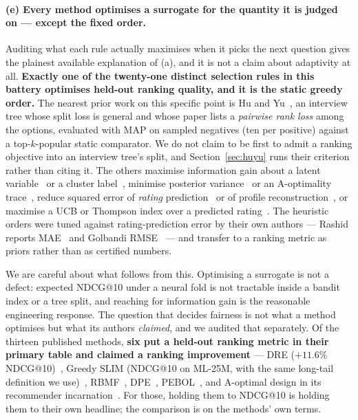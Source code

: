\documentclass[11pt]{article}
\begin{document}
\paragraph{(e) Every method optimises a surrogate for the quantity it is judged on --- except the
fixed order.} Auditing what each rule actually maximises when it picks the next question gives the
plainest available explanation of (a), and it is not a claim about adaptivity at all.
\textbf{Exactly one of the twenty-one distinct selection rules in this battery optimises held-out
ranking quality, and it is the static greedy order.} The nearest prior work on this specific point is
Hu and Yu~\cite{hu2013interview}, an interview tree whose split loss is general and whose paper lists
a \emph{pairwise rank loss} among the options, evaluated with MAP on sampled negatives (ten per
positive) against a top-$k$-popular static comparator. We do not claim to be first to admit a ranking
objective into an interview tree's split, and Section~\ref{sec:huyu} runs their criterion rather than
citing it. The others maximise information gain about a latent variable~\cite{ma2019eddi} or a
cluster label~\cite{rashid2008learning}, minimise posterior
variance~\cite{houlsby2011bald} or an A-optimality trace~\cite{anava2015budget,sepliarskaia2018spq},
reduce squared error of \emph{rating} prediction~\cite{golbandi2011adaptive,zhou2011functional} or of
profile reconstruction~\cite{kweon2020deep,proissl2024greedyslim}, or maximise a UCB or Thompson
index over a predicted rating~\cite{zhao2013interactive,zhang2020conucb,wang2023conlinucb,liu2025clisk,parapar2021dpe}.
The heuristic orders were tuned against rating-prediction error by their own authors --- Rashid
reports MAE~\cite{rashid2002getting,rashid2008learning} and Golbandi
RMSE~\cite{golbandi2011adaptive} --- and transfer to a ranking metric as priors rather than as
certified numbers.

We are careful about what follows from this. Optimising a surrogate is not a defect: expected
NDCG@10 under a neural fold is not tractable inside a bandit index or a tree split, and reaching for
information gain is the reasonable engineering response. The question that decides fairness is not
what a method optimises but what its authors \emph{claimed}, and we audited that separately. Of the
thirteen published methods, \textbf{six put a held-out ranking metric in their primary table and
claimed a ranking improvement} --- DRE ($+11.6\%$ NDCG@10)~\cite{kweon2020deep}, Greedy
SLIM (NDCG@10 on ML-25M, with the same long-tail definition we use)~\cite{proissl2024greedyslim},
RBMF~\cite{liu2011wisdom}, DPE~\cite{parapar2021dpe}, PEBOL~\cite{austin2024bayesian}, and A-optimal
design in its recommender incarnation~\cite{anava2015budget}. For those, holding them to NDCG@10 is holding them to their own headline; the comparison is on the
methods' own terms.
\end{document}
